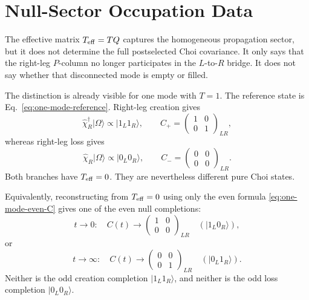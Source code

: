 \documentclass[aps,prb,onecolumn,nofootinbib,superscriptaddress]{revtex4-2}
\newcommand{\ket}[1]{\lvert #1\rangle}
\theoremstyle{plain}
\theoremstyle{definition}
\begin{document}
\section{Null-Sector Occupation Data}

The effective matrix \(T_{\rm eff}=TQ\) captures the homogeneous propagation
sector, but it does not determine the full postselected Choi covariance.  It
only says that the right-leg \(P\)-column no longer participates in the
\(L\)-to-\(R\) bridge.  It does not say whether that disconnected mode is empty
or filled.

The distinction is already visible for one mode with \(T=1\).  The reference
state is Eq.~\eqref{eq:one-mode-reference}.  Right-leg creation gives
\begin{equation}
  \hat\chi_R^\dagger\ket{\Omega}
  \propto
  \ket{1_L1_R},
  \qquad
  C_+
  =
  \begin{pmatrix}
    1 & 0\\
    0 & 1
  \end{pmatrix}_{LR},
  \label{eq:one-mode-creation}
\end{equation}
whereas right-leg loss gives
\begin{equation}
  \hat\chi_R\ket{\Omega}
  \propto
  \ket{0_L0_R},
  \qquad
  C_-
  =
  \begin{pmatrix}
    0 & 0\\
    0 & 0
  \end{pmatrix}_{LR}.
  \label{eq:one-mode-loss}
\end{equation}
Both branches have \(T_{\rm eff}=0\).  They are nevertheless different pure
Choi states.

Equivalently, reconstructing from \(T_{\rm eff}=0\) using only the even formula
\eqref{eq:one-mode-even-C} gives one of the even null completions:
\begin{equation}
  t\to0:
  \quad
  C(t)\to
  \begin{pmatrix}
    1 & 0\\
    0 & 0
  \end{pmatrix}_{LR}
  \quad
  (\ket{1_L0_R}),
  \label{eq:even-null-tzero}
\end{equation}
or
\begin{equation}
  t\to\infty:
  \quad
  C(t)\to
  \begin{pmatrix}
    0 & 0\\
    0 & 1
  \end{pmatrix}_{LR}
  \quad
  (\ket{0_L1_R}).
  \label{eq:even-null-tinfty}
\end{equation}
Neither is the odd creation completion \(\ket{1_L1_R}\), and neither is the
odd loss completion \(\ket{0_L0_R}\).
\end{document}
